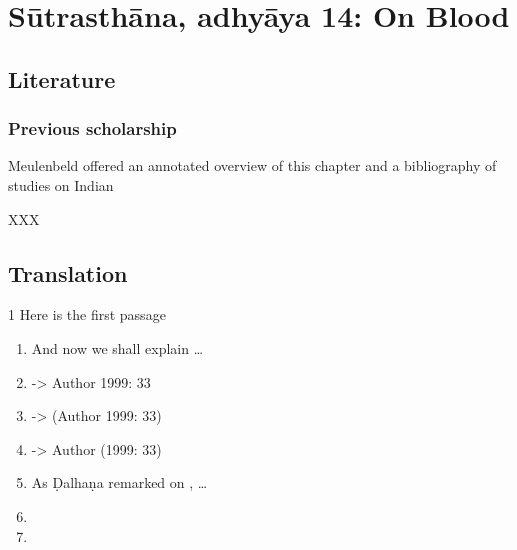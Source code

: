 
\section{Sūtrasthāna, adhyāya 14:  On Blood}


\subsection{Literature} 

\subsubsection{Previous scholarship}

Meulenbeld offered an annotated overview of this chapter and a bibliography
of studies on Indian 



XXX

\subsection{Translation}

\begin{translation}    
    \item [1] Here is the first passage
    
    \begin{enumerate}
        
        \item 
        And now we shall explain \ldots {}
        
        \item 
        
        \cite[33]{adri-1984} -> Author 1999: 33
        \item     
        \citep[33]{adri-1984} -> (Author 1999: 33)
        \item     
        \citet[33]{adri-1984} -> Author (1999: 33) 
        \item 
        As Ḍalhaṇa remarked on , \ldots  %
        \item \SS
        \item \CS
    \end{enumerate}
    
    
\end{translation}

